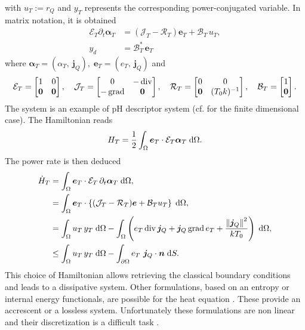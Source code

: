 with $u_T:=r_Q$ and $y_T$ represents the corresponding power-conjugated variable. In matrix notation, it is obtained
\begin{equation}
\begin{aligned}
\mathcal{E}_T \partial_{t} \bm{\alpha}_T  &= \left(\mathcal{J}_T - \mathcal{R}_T \right)\bm{e}_T + \mathcal{B}_{T}\, u_T, \\
y_d &= \mathcal{B}_{T}^* \, \bm{e}_T
\end{aligned}
\end{equation}
where $\bm{\alpha}_T = (\alpha_T,\ \bm{j}_Q), \; \bm{e}_T = (e_T,\ \bm{j}_Q)$ and
\begin{equation*}
\mathcal{E}_T = \begin{bmatrix}
1 & 0 \\
\bm{0} & \bm{0} \\
\end{bmatrix}, \quad
\mathcal{J}_T = \begin{bmatrix}
0 & -\operatorname{div} \\
-\operatorname*{grad} & \bm{0} \\
\end{bmatrix}, \quad 
\mathcal{R}_T = \begin{bmatrix}
0 & 0 \\
\bm{0} & (T_0 k)^{-1} \\
\end{bmatrix}, \quad
\mathcal{B}_T = \begin{bmatrix}
1 \\
\bm{0} \\
\end{bmatrix}.
\end{equation*}
The system is an example of pH descriptor system (cf. \cite{beattie2018linear} for the finite dimensional case). The Hamiltonian reads 
\begin{equation}\label{eq:hamHeat}
	H_T = \frac{1}{2}\int_\Omega \bm{e}_T \cdot \mathcal{E}_T\bm{\alpha}_T \d\Omega.
\end{equation}
The power rate is then deduced
\begin{equation}\label{eq:enrateHeat}
\begin{aligned}
\dot{H}_T &= \int_\Omega \bm{e}_T \cdot \mathcal{E}_T\, \partial_t \bm{\alpha}_T \d\Omega, \\
		&= \int_\Omega \bm{e}_T \cdot \left\{(\mathcal{J}_T-\mathcal{R}_T) \bm{e} + \mathcal{B}_T u_T \right\} \d\Omega, \\
		&= \int_\Omega u_T \, y_T \d\Omega -\int_\Omega \left(e_T \div \bm{j}_Q + \bm{j}_Q \grad e_T + \frac{\norm{\bm{j}_Q}^2}{k T_0} \right) \d\Omega, \\
		&\le \int_\Omega u_T \, y_T \d\Omega -\int_{\partial\Omega} e_T \ \bm{j}_Q \cdot \bm{n} \d{S}.
\end{aligned}
\end{equation}
This choice of Hamiltonian allows retrieving the classical boundary conditions and leads to a dissipative system. Other formulations, based on an entropy or internal energy functionals, are possible for the heat equation \cite{duindam2009,serhani2019modeling}. These provide an accrescent or a lossless system. Unfortunately these formulations are non linear and their discretization is a difficult task \cite{serhani2019discretization}. 


